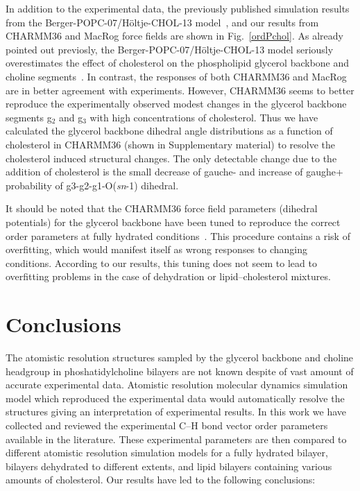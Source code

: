 \documentclass[pre,aps,floatfix,authordate1-4,twocolumn]{revtex4-1}
\begin{document}
In addition to the experimental data, the previously published simulation results from the Berger-POPC-07/H\"oltje-CHOL-13 model~\cite{ferreira13},
and our results from CHARMM36 and MacRog force fields  
are shown in Fig.~\ref{ordPchol}. As already pointed out previosly, the Berger-POPC-07/H\"oltje-CHOL-13 model
seriously overestimates the effect of cholesterol on the phospholipid glycerol backbone and choline segments~\cite{ferreira13}.
In contrast, the responses of both CHARMM36 and MacRog are in better agreement
with experiments. However, CHARMM36 seems to better reproduce the experimentally observed modest changes in the glycerol backbone segments 
g$_2$ and g$_3$ with high concentrations of cholesterol. Thus we have calculated the glycerol backbone dihedral angle distributions
as a function of cholesterol in CHARMM36 (shown in Supplementary material) to resolve the cholesterol induced structural changes. The only detectable change due to the
addition of cholesterol is the small decrease of gauche- and increase of gaughe+ probability of g3-g2-g1-O(\textit{sn}-1) dihedral.


It should be noted that the CHARMM36 force field parameters (dihedral potentials) for the glycerol backbone have been tuned to reproduce the correct order parameters at fully hydrated conditions~\cite{klauda10}. 
This procedure contains a risk of overfitting, which would manifest itself as wrong responses to changing conditions. 
According to our results, this tuning does not seem to lead to overfitting problems in the case of dehydration or lipid--cholesterol mixtures. 


\pagebreak
\section{Conclusions}
The atomistic resolution structures sampled by the glycerol backbone and choline headgroup
in phoshatidylcholine bilayers are not known despite of vast amount of accurate experimental
data. Atomistic resolution molecular dynamics simulation model which reproduced the
experimental data would automatically resolve the structures giving an interpretation of experimental results.
In this work we have collected and reviewed the experimental C--H bond vector order
parameters available in the literature. These experimental parameters are then compared to
different atomistic resolution simulation models for a fully hydrated bilayer, bilayers dehydrated to different extents, and
lipid bilayers containing various amounts of cholesterol. Our results have led to the following conclusions:
\end{document}
